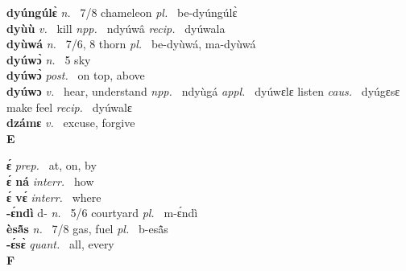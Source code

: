 {\bfseries dyúngúlɛ̀}  {\itshape n.~} 7/8 chameleon {\itshape pl.~} be-dyúngúlɛ̀   \\ 
{\bfseries dyùù}  {\itshape v.~} kill   {\itshape npp.~} ndyúwâ {\itshape recip.~} dyúwala  \\ 
{\bfseries dyùwá}  {\itshape n.~} 7/6, 8 thorn {\itshape pl.~} be-dyùwá, ma-dyùwá    \\ 
{\bfseries dyúwɔ̀}  {\itshape n.~} 5 sky    \\ 
{\bfseries dyúwɔ̀}  {\itshape post.~} on top, above    \\ 
{\bfseries dyúwɔ}  {\itshape v.~} hear, understand   {\itshape npp.~} ndyùgá {\itshape appl.~} dyúwɛlɛ listen {\itshape caus.~} dyúgɛsɛ make feel {\itshape recip.~} dyúwalɛ  \\ 
{\bfseries dzámɛ}  {\itshape v.~} excuse, forgive    \\ 

\medskip
\noindent \large {\bfseries E}\normalsize\\
\medskip

\noindent
{\bfseries ɛ́}  {\itshape prep.~} at, on, by    \\ 
{\bfseries ɛ́ ná}  {\itshape interr.~} how    \\ 
{\bfseries ɛ́ vɛ́}  {\itshape interr.~} where    \\ 
{\bfseries -ɛ́ndì} d- {\itshape n.~} 5/6 courtyard {\itshape pl.~} m-ɛ́ndì    \\ 
{\bfseries èsã̂s}  {\itshape n.~} 7/8 gas, fuel {\itshape pl.~} b-esã̂s    \\ 
{\bfseries -ɛ́sɛ̀}  {\itshape quant.~} all, every    \\
 
\medskip
\noindent \large {\bfseries F}\normalsize\\
\medskip

